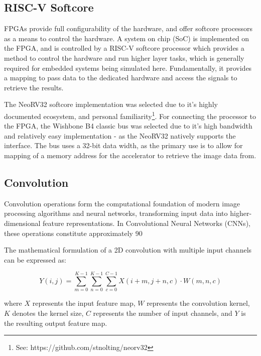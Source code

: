 \newpage


\subsection{RISC-V Softcore}

FPGAs provide full configurability of the hardware, and offer softcore processors as a means to control the hardware.
A system on chip (SoC) is implemented on the FPGA, and is controlled by a RISC-V softcore processor which provides a method to control the hardware and run higher layer tasks, which is generally required for embedded systems being simulated here.
Fundamentally, it provides a mapping to pass data to the dedicated hardware and access the signals to retrieve the results.

The NeoRV32 softcore implementation was selected due to it's highly documented ecosystem, and personal familiarity\footnote[1]{See: https://github.com/stnolting/neorv32}.
For connecting the processor to the FPGA, the Wishbone B4 classic bus was selected due to it's high bandwidth and relatively easy implementation - as the NeoRV32 natively supports the interface.
The bus uses a 32-bit data width, as the primary use is to allow for mapping of a memory address for the accelerator to retrieve the image data from.

\subsection{Convolution}
\label{sec:convolution}

Convolution operations form the computational foundation of modern image processing algorithms and neural networks, transforming input data into higher-dimensional feature representations. In Convolutional Neural Networks (CNNs), these operations constitute approximately 90%

The mathematical formulation of a 2D convolution with multiple input channels can be expressed as:

\begin{equation}
    Y(i,j) = \sum_{m=0}^{K-1} \sum_{n=0}^{K-1} \sum_{c=0}^{C-1} X(i+m,j+n,c) \cdot W(m,n,c)
\end{equation}

where $X$ represents the input feature map, $W$ represents the convolution kernel, $K$ denotes the kernel size, $C$ represents the number of input channels, and $Y$ is the resulting output feature map.

